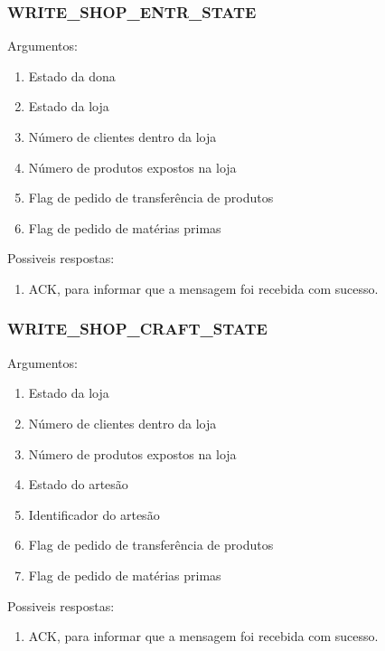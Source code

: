 \documentclass[11pt,a4paper]{report}
\begin{document}
\subsubsection{WRITE\_SHOP\_ENTR\_STATE}
Argumentos:
\begin{enumerate}
    \itemsep-0.4em
    \item Estado da dona
    \item Estado da loja
    \item Número de clientes dentro da loja
    \item Número de produtos expostos na loja
    \item Flag de pedido de transferência de produtos
    \item Flag de pedido de matérias primas
\end{enumerate}
Possiveis respostas:
\begin{enumerate}
    \itemsep-0.4em
    \item ACK, para informar que a mensagem foi recebida com sucesso.
\end{enumerate}
    
\subsubsection{WRITE\_SHOP\_CRAFT\_STATE}
Argumentos:
\begin{enumerate}
    \itemsep-0.4em
    \item Estado da loja
    \item Número de clientes dentro da loja
    \item Número de produtos expostos na loja
    \item Estado do artesão
    \item Identificador do artesão
    \item Flag de pedido de transferência de produtos
    \item Flag de pedido de matérias primas
\end{enumerate}
Possiveis respostas:
\begin{enumerate}
    \itemsep-0.4em
    \item ACK, para informar que a mensagem foi recebida com sucesso.
\end{enumerate}
\end{document}
